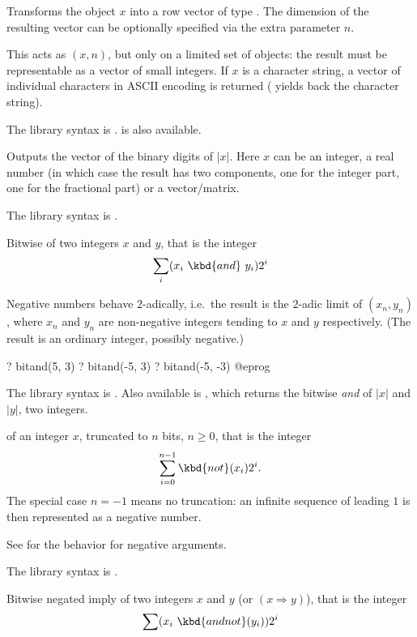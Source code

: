 \label{se:Vecsmall}
Transforms the object $x$ into a row vector of type . The
dimension of the resulting vector can be optionally specified via the extra
parameter $n$.

This acts as $(x,n)$, but only on a limited set of objects:
the result must be representable as a vector of small integers.
If $x$ is a character string, a vector of individual characters in ASCII
encoding is returned ( yields back the character string).

The library syntax is .
 is also available.

\label{se:binary}
Outputs the vector of the binary digits of $|x|$.
Here $x$ can be an integer, a real number (in which case the result has two
components, one for the integer part, one for the fractional part) or a
vector/matrix.

The library syntax is .

\label{se:bitand}
Bitwise 
of two integers $x$ and $y$, that is the integer
$$\sum_i (x_i~\kbd{and}~y_i) 2^i$$

Negative numbers behave $2$-adically, i.e.~the result is the $2$-adic limit
of $(x_n,y_n)$, where $x_n$ and $y_n$ are non-negative integers
tending to $x$ and $y$ respectively. (The result is an ordinary integer,
possibly negative.)

\bprog
? bitand(5, 3)
? bitand(-5, 3)
? bitand(-5, -3)
@eprog

The library syntax is .
Also available is
, which returns the bitwise \emph{and}
of $|x|$ and $|y|$, two integers.

\label{se:bitneg}
 of an integer $x$,
truncated to $n$ bits, $n\geq 0$, that is the integer
$$\sum_{i=0}^{n-1} \kbd{not}(x_i) 2^i.$$
The special case $n=-1$ means no truncation: an infinite sequence of
leading $1$ is then represented as a negative number.

See  for the behavior for negative arguments.

The library syntax is .

\label{se:bitnegimply}
Bitwise negated imply of two integers $x$ and
$y$ (or  $(x \Rightarrow y)$), that is the integer $$\sum
(x_i~\kbd{and not}(y_i)) 2^i$$

